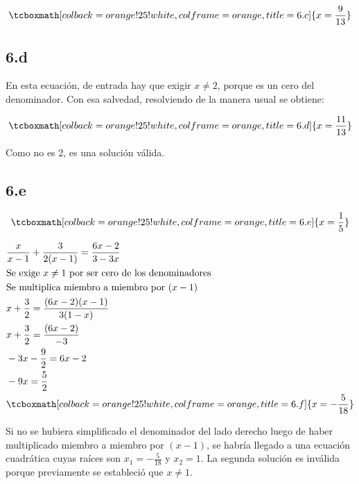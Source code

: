 \documentclass{article}
\begin{document}
\begin{equation}
\tcboxmath[colback=orange!25!white,colframe=orange, title=6.c] { x = \frac{9}{13} }
\end{equation}

\subsection*{6.d}
\label{subsec:6.d}

En esta ecuación, de entrada hay que exigir $x \neq 2$, porque es un cero del denominador. Con esa salvedad, resolviendo de la manera usual se obtiene:

\begin{equation}
\tcboxmath[colback=orange!25!white,colframe=orange, title=6.d] { x = \frac{11}{13} }
\end{equation}

Como no es 2, es una solución válida.

\subsection*{6.e}
\label{subsec:6.e}

\begin{equation}
\tcboxmath[colback=orange!25!white,colframe=orange, title=6.e] { x = \frac{1}{5} }
\end{equation}

\begin{subequations}
\begin{align}
& \frac{x}{x-1} + \frac{3}{2(x-1)} = \frac{6x-2}{3-3x} \\
& \text{Se exige } x \neq 1 \text{ por ser cero de los denominadores} \\
& \text{Se multiplica miembro a miembro por } (x-1) \\
& x + \frac{3}{2} = \frac{(6x-2) (x-1)}{3 (1-x)} \\
& x + \frac{3}{2} = \frac{(6x-2)}{-3} \\
& -3x - \frac{9}{2} = 6x - 2 \\
& -9x = \frac{5}{2} \\
& \tcboxmath[colback=orange!25!white,colframe=orange, title=6.f] { x = -\frac{5}{18} }
\end{align}
\end{subequations}

Si no se hubiera simplificado el denominador del lado derecho luego de haber multiplicado miembro a miembro por $(x-1)$, se habría llegado a una ecuación cuadrática cuyas raíces son $x_1 = -\frac{5}{18}$ y $x_2 = 1$. La segunda solución es inválida porque previamente se estableció que $x \neq 1$.
\end{document}
